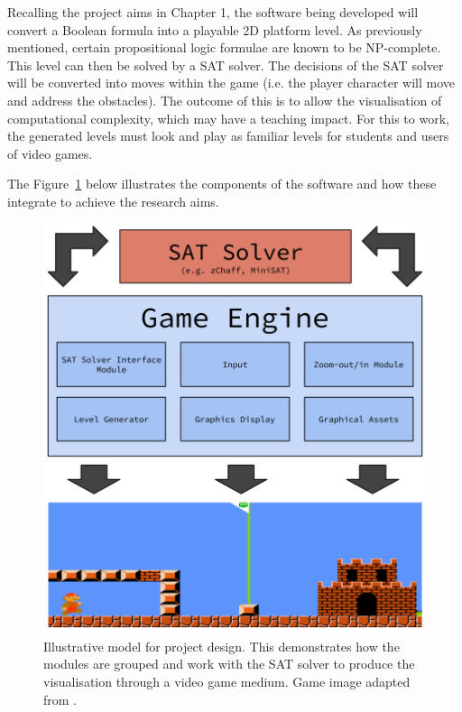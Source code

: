 \documentclass[11pt, a4paper, oneside]{report} %
\begin{document}
Recalling the project aims in Chapter 1, the software being developed will convert a Boolean formula
into a playable 2D platform level. As previously mentioned, certain propositional logic formulae are
known to be NP-complete. This level can then be solved by a SAT solver. The decisions of the SAT
solver will be converted into moves within the game (i.e. the player character will move and address
the obstacles). The outcome of this is to allow the visualisation of computational complexity, which
may have a teaching impact. For this to work, the generated levels must look and play as familiar
levels for students and users of video games.

The Figure~\ref{project_design} below illustrates the components of the software and how these integrate to achieve the
research aims.


\begin{figure}[h!]
  
  \centering
    \includegraphics[scale=0.3]{diagram(2)}
  \caption{Illustrative model for project design. This demonstrates how the modules are grouped and work with the SAT solver to produce the visualisation through a video game medium. Game image adapted from \cite{Aloupis2012}.}
  \label{project_design}
\end{figure}
\end{document}
